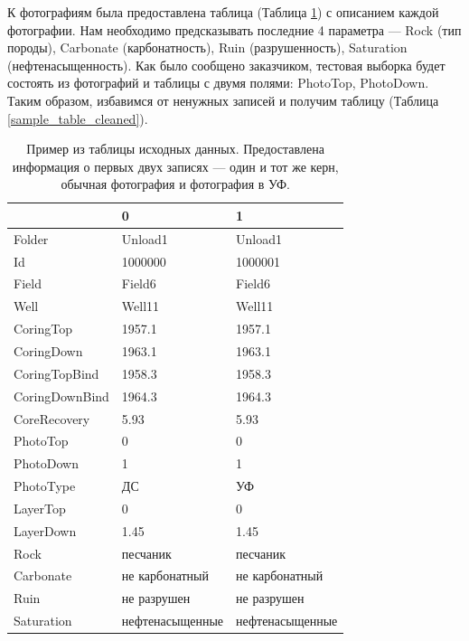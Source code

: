 \documentclass[14pt]{matmex-diploma}
\begin{document}
    К фотографиям была предоставлена таблица (Таблица \ref{sample_table}) с описанием каждой фотографии. Нам необходимо предсказывать последние 4 параметра — Rock (тип породы), Carbonate (карбонатность), Ruin (разрушенность), Saturation (нефтенасыщенность). Как было сообщено заказчиком, тестовая выборка будет состоять из фотографий и таблицы с двумя полями: PhotoTop, PhotoDown. Таким образом, избавимся от ненужных записей и получим таблицу (Таблица \ref{sample_table_cleaned}).
    
    \begin{table}[h]
        \centering
        \begin{tabular}{|l|l|l|}
            \hline
            {} &                0 &                1 \\
            \hline
            Folder         &          Unload1 &          Unload1 \\
            Id             &          1000000 &          1000001 \\
            Field          &           Field6 &           Field6 \\
            Well           &           Well11 &           Well11 \\
            CoringTop      &           1957.1 &           1957.1 \\
            CoringDown     &           1963.1 &           1963.1 \\
            CoringTopBind  &           1958.3 &           1958.3 \\
            CoringDownBind &           1964.3 &           1964.3 \\
            CoreRecovery   &             5.93 &             5.93 \\
            PhotoTop       &                0 &                0 \\
            PhotoDown      &                1 &                1 \\
            PhotoType      &               ДС &               УФ \\
            LayerTop       &                0 &                0 \\
            LayerDown      &             1.45 &             1.45 \\
            Rock           &         песчаник &         песчаник \\
            Carbonate      &   не карбонатный &   не карбонатный \\
            Ruin           &      не разрушен &      не разрушен \\
            Saturation     &  нефтенасыщенные &  нефтенасыщенные \\
            \hline
        \end{tabular}
        \caption{Пример из таблицы исходных данных. Предоставлена информация о первых двух записях — один и тот же керн, обычная фотография и фотография в УФ.}
        \label{sample_table}  
    \end{table}
    
\end{document}
